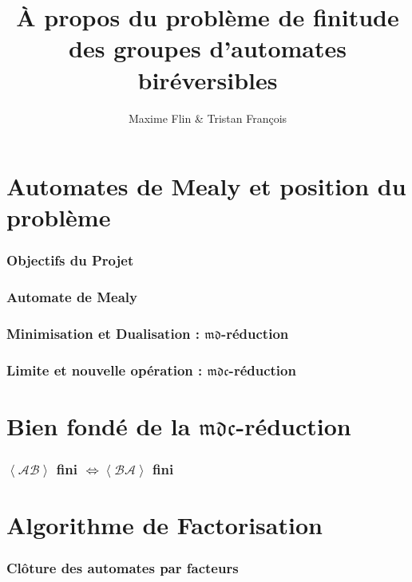 \documentclass[11pt]{beamer}
\begin{document}
	\author{Maxime Flin  \& Tristan François}
	\title{\`A propos du problème de finitude des groupes d'automates biréversibles}
	\begin{frame}[plain]
		\maketitle
	\end{frame}
	
	\section{Automates de Mealy et position du problème}
	
	\begin{frame}
		\frametitle{Objectifs du Projet}
	\end{frame}

	\begin{frame}
		\frametitle{Automate de Mealy}
	\end{frame}

	\begin{frame}
		\frametitle{Minimisation et Dualisation : $\mathfrak{md}$-réduction}
	\end{frame}

	\begin{frame}
		\frametitle{Limite et nouvelle opération : $\mathfrak{mdc}$-réduction}
	\end{frame}

	\section{Bien fondé de la $\mathfrak{mdc}$-réduction}
	
	\begin{frame}
		\frametitle{$\left<\mathcal{A}\mathcal{B}\right>$ fini $\Leftrightarrow \left<\mathcal{B}\mathcal{A}\right>$ fini}
	\end{frame}

	\section{Algorithme de Factorisation}
	
	\begin{frame}
		\frametitle{Clôture des automates par facteurs}
	\end{frame}
\end{document}
